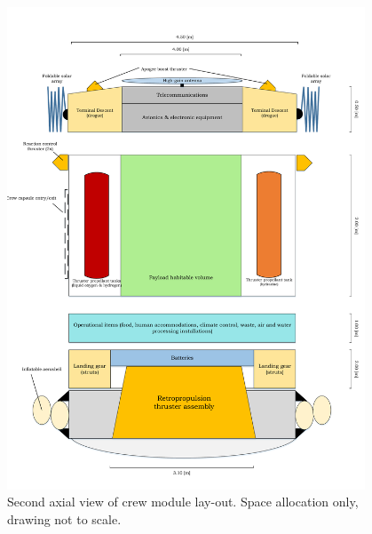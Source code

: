 \begin{figure}[h]
		\centering
		\includegraphics[width=0.95\textwidth]{./Figure/CrewModule/Axialview2.pdf}
		\caption[Second axial view of crew module lay-out]{Second axial view of crew module lay-out. Space allocation only, drawing not to scale.}
		\label{fig:axview2}
\end{figure}

